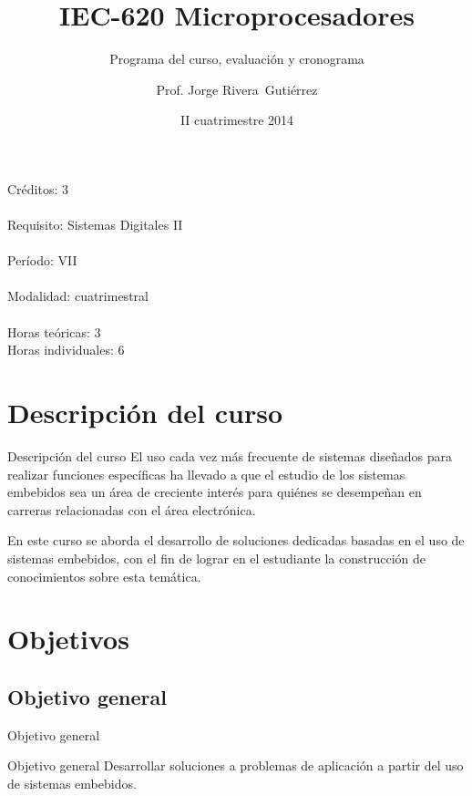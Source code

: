 \documentclass[handout,xcolor=dvipsnames]{beamer}
\title[IEC-620]{IEC-620 Microprocesadores}
\subtitle{Programa del curso, evaluación y cronograma}
\author{Prof. Jorge Rivera~Guti\'errez}
\institute{Universidad Latina de Costa Rica\\ Ingenier\'\i a en Electr\'onica}
\date{II cuatrimestre 2014}
\newcommand{\pageframe}[1]{\frame{\begin{center}{ \Huge #1 }\end{center}}}
\begin{document}
\begin{frame}
 \maketitle
\end{frame}

\begin{frame}
 \begin{center}
  \Large Créditos: 3\\~\\
  Requisito: Sistemas Digitales II\\~\\
  Período: VII\\~\\
  Modalidad: cuatrimestral\\~\\
  Horas te\'oricas: 3\\
  Horas individuales: 6
 \end{center}
\end{frame}

\section{Descripción del curso}

\begin{frame}{Descripción del curso}
 El uso cada vez más frecuente de sistemas diseñados para realizar funciones específicas ha llevado a que el estudio de los sistemas embebidos sea un área de creciente interés para quiénes se desempeñan en carreras relacionadas con el área electrónica.

En este curso se aborda el desarrollo de soluciones dedicadas basadas en el uso de sistemas embebidos, con el fin de lograr en el estudiante la construcción de conocimientos sobre esta temática.
\end{frame}

\section{Objetivos}

\pageframe{Objetivos}

\subsection{Objetivo general}

\begin{frame}{Objetivo general}
  \begin{block}{Objetivo general}
  Desarrollar soluciones a problemas de aplicación a partir del uso de sistemas embebidos.
  \end{block}
\end{frame}
\end{document}
